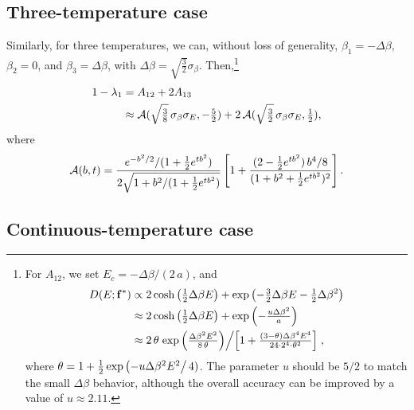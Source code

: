 \documentclass[aip,jcp,preprint,superscriptaddress]{revtex4-1}
\begin{document}
\subsection{Three-temperature case}



Similarly,
for three  temperatures,
%
we can, without loss of generality,
$\beta_1 = -\Delta \beta$,
$\beta_2 = 0$,
and
$\beta_3 = \Delta \beta$,
with
$\Delta \beta = \sqrt{\frac 3 2} \sigma_\beta$.
%
Then,\footnote{
%
For $A_{12}$,
we set $E_c = -\Delta \beta/(2 \, a)$,
and
\begin{align*}
D(E; \mathbf{f}^*)
&\propto
2 \cosh\left(
  \tfrac{1}{2} \Delta \beta E
\right)
+
\exp\left(
  -\tfrac{3}{2} \Delta \beta E
  -\tfrac{1}{2} \Delta \beta^2
\right)
\\
&\approx
2 \cosh\left(
  \tfrac{1}{2} \Delta \beta E
\right)
+
\exp\left(
  -\tfrac{ u \Delta \beta^2 }{ a }
\right)
\\
&\approx
2 \, \theta
\left.
  \exp\left(
    \tfrac{\Delta \beta^2 E^2} { 8 \, \theta }
  \right)
\middle/
  \left[
    1
    +
    \tfrac{ (3 - \theta) \Delta \beta^4 E^4 }
    { 24 \cdot 2^4 \cdot \theta^2 }
  \right]
\right.,
\end{align*}
where
$\theta = 1 + \frac 1 2 \exp\left(-u \Delta \beta^2 E^2\right/4)$.
%
The parameter $u$ should be $5/2$
to match the small $\Delta \beta$ behavior,
although the overall accuracy can be improved
by a value of $u \approx 2.11$.
}
%
\begin{align}
1 - \lambda_1
&= A_{12} + 2 A_{13}
\notag \\
&\approx
\mathcal{A}(\sqrt{\tfrac 3 8} \, \sigma_\beta \sigma_E, -\tfrac 5 2)
+
2 \, \mathcal{A}(\sqrt{\tfrac 3 2} \, \sigma_\beta \sigma_E, \tfrac 1 2),
\label{eq:lambda1_threeT}
\end{align}
where
\begin{align*}
\mathcal{A}(b, t)
=
\frac{
  e^{-b^2/2} / (1 + \frac{1}{2}e^{tb^2})
}
{
  2 \sqrt{1 + b^2/(1 + \frac{1}{2} e^{tb^2})}
}
\left[
  1
  +
  \frac{(2 - \frac{1}{2} e^{tb^2}) \, b^4/8}
  { (1 + b^2 + \frac{1}{2} e^{tb^2})^2 }
\right].
\end{align*}




\subsection{Continuous-temperature case}
\end{document}

